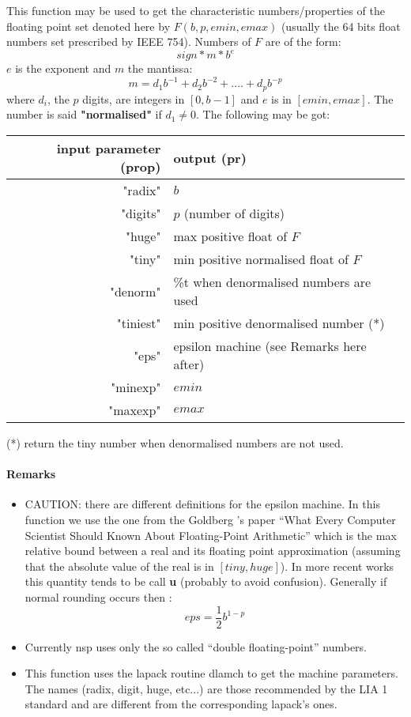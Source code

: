 \begin{mandescription}

    This function may be used to get the characteristic
    numbers/properties of the floating point set denoted here by
    $F(b,p,emin,emax)$ (usually the 64 bits float numbers set prescribed 
    by IEEE 754). Numbers of $F$ are of the form:
    $$
     sign * m * b^e
    $$
    $e$ is the exponent and $m$ the mantissa:
    $$
     m = d_1 b^{-1} + d_2 b^{-2} + .... + d_p b^{-p}
    $$
    where $d_i$, the $p$ digits, are integers in $[0, b-1]$ and $e$ is in 
    $[emin, emax]$. The number is said \textbf{"normalised"} if $d_1
    \ne 0$. The following may be got: 
  \begin{tabular}{|r|l|}
    input parameter (prop) & output (pr) \\
  \hline
   "radix"  & $b$ \\
   "digits" & $p$ (number of digits) \\
   "huge"   & max positive float of $F$ \\
   "tiny"   & min positive normalised float of $F$ \\
   "denorm" & \%t when denormalised numbers are used \\
   "tiniest"& min positive denormalised number (*) \\ 
   "eps"    & epsilon machine (see Remarks here after) \\
   "minexp" & $emin$ \\
   "maxexp" & $emax$ \\
   \end{tabular}

(*) return the tiny number when denormalised numbers are not used.


  \paragraph{Remarks}
    \begin{itemize}
    \item CAUTION: there are different definitions for the epsilon
      machine. In this function we use the one from the
      Goldberg 's paper ``What Every Computer Scientist Should Known 
      About Floating-Point Arithmetic'' which  is the max
    relative bound between a real and its floating point approximation
    (assuming that the absolute value of the real is in $[tiny,
    huge]$). In more recent works this quantity
    tends to be call \textbf{u} (probably to avoid
    confusion). Generally if normal rounding occurs then :
    $$
      eps = \frac{1}{2} b^{1-p}
    $$
    \item Currently nsp uses only the so called ``double
      floating-point'' numbers.
    \item This function uses the lapack routine dlamch to get the
      machine parameters. The names (radix, digit, huge, etc...) 
      are those recommended  by the LIA 1 standard and are different 
      from the corresponding lapack's  ones.
  \end{itemize}

\end{mandescription}
  

